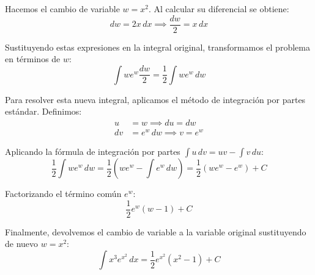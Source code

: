 \documentclass[11pt,paper=a4,answers, addpoints]{exam}
\begin{document}
\begin{questions}
\begin{solution}
Hacemos el cambio de variable $w = x^2$. Al calcular su diferencial se obtiene:
\[ dw = 2x \, dx \implies \frac{dw}{2} = x \, dx \]

Sustituyendo estas expresiones en la integral original, transformamos el problema en términos de $w$:
\[ \int w e^w \frac{dw}{2} = \frac{1}{2} \int w e^w \, dw \]

Para resolver esta nueva integral, aplicamos el método de integración por partes estándar. Definimos:
\begin{align*}
u &= w \implies du = dw \\
dv &= e^w \, dw \implies v = e^w
\end{align*}

Aplicando la fórmula de integración por partes $\int u \, dv = u v - \int v \, du$:
\[ \frac{1}{2} \int w e^w \, dw = \frac{1}{2} \left( w e^w - \int e^w \, dw \right) = \frac{1}{2} (w e^w - e^w) + C \]

Factorizando el término común $e^w$:
\[ \frac{1}{2} e^w (w - 1) + C \]

Finalmente, devolvemos el cambio de variable a la variable original sustituyendo de nuevo $w = x^2$:
\[ \int x^3 e^{x^2} \, dx = \frac{1}{2} e^{x^2} (x^2 - 1) + C \]
\end{solution}

\end{questions}
\end{document}
